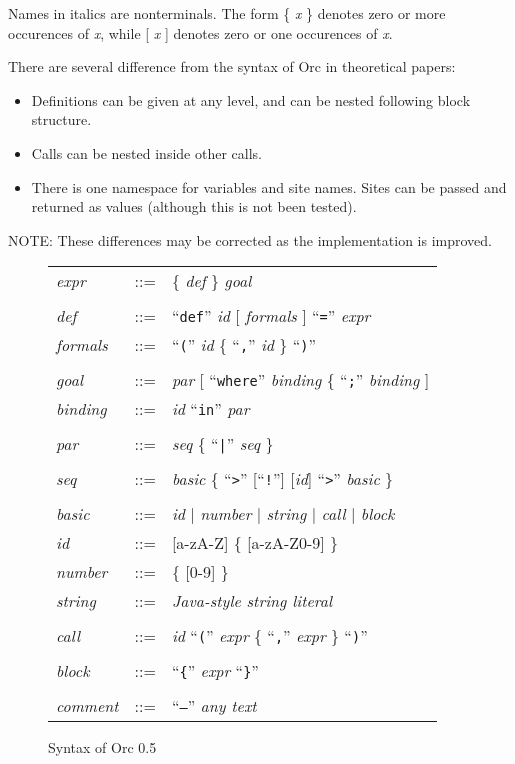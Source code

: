 \documentclass{article}
\newcommand{\s}[1]{{\it{#1}}}
\newcommand{\B}[1]{``{\tt{#1}}''}
\newcommand{\Q}[1]{``{\tt{#1}}''}
\begin{document}
Names in italics are nonterminals. The form 
\{ \s{x} \} denotes zero or more occurences of \s{x}, while
[ \s{x} ] denotes zero or one occurences of \s{x}.

There are several difference from the syntax of Orc in theoretical papers:

\begin{itemize}
\item Definitions can be given at any level, and can be nested following block structure.
\item Calls can be nested inside other calls.
\item There is one namespace for variables and site names. Sites can be passed
and returned as values (although this is not been tested).
\end{itemize}

NOTE: These differences may be corrected as the implementation is improved.

\begin{figure}
\begin{tabular}{lcl}
\s{expr} &::=& \{ \s{def} \} \s{goal} 
\\\\
\s{def} &::=& \B{def} \s{id} [ \s{formals} ] \Q{=} \s{expr}
\\[3pt]
\s{formals} &::=& \Q{(} \s{id} \{ \Q{,} \s{id} \} \Q{)}
\\\\
\s{goal} &::=& \s{par} [ \B{where} \s{binding} \{ \Q{;} \s{binding} ]
\\[3pt]
\s{binding} &::=& \s{id} \B{in} \s{par}
\\\\
\s{par} &::=& \s{seq} \{ \Q{|} \s{seq} \}
\\\\
\s{seq} &::=& \s{basic} \{ \Q{>} [\Q{!}] [\s{id}] \Q{>} \s{basic}  \}
\\\\
\s{basic} &::=& \s{id} $\mid$ \s{number} $\mid$ \s{string} $\mid$ \s{call} $\mid$ \s{block}
\\[3pt]
\s{id} &::=& [a-zA-Z] \{ [a-zA-Z0-9] \}
\\[3pt]
\s{number} &::=& \{ [0-9] \}
\\[3pt]
\s{string} &::=& \s{Java-style string literal}
\\\\
\s{call} &::=& \s{id} \Q{(} \s{expr} \{ \Q{,} \s{expr} \} \Q{)}
\\\\
\s{block} &::=& \Q{\{} \s{expr} \Q{\}} 
\\\\
\s{comment} &::=& \Q{--} \s{any text}
\end{tabular}
\caption{\label{syntax}Syntax of Orc 0.5}
\end{figure}
\end{document}
